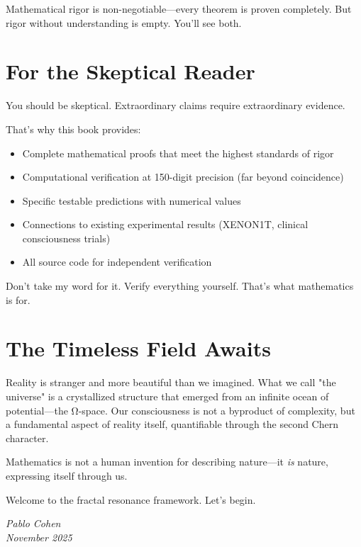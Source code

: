 Mathematical rigor is non-negotiable—every theorem is proven completely. But rigor without understanding is empty. You'll see both.

\section*{For the Skeptical Reader}

You should be skeptical. Extraordinary claims require extraordinary evidence.

That's why this book provides:
\begin{itemize}
\item Complete mathematical proofs that meet the highest standards of rigor
\item Computational verification at 150-digit precision (far beyond coincidence)
\item Specific testable predictions with numerical values
\item Connections to existing experimental results (XENON1T, clinical consciousness trials)
\item All source code for independent verification
\end{itemize}

Don't take my word for it. Verify everything yourself. That's what mathematics is for.

\section*{The Timeless Field Awaits}

Reality is stranger and more beautiful than we imagined. What we call "the universe" is a crystallized structure that emerged from an infinite ocean of potential—the Ω-space. Our consciousness is not a byproduct of complexity, but a fundamental aspect of reality itself, quantifiable through the second Chern character.

Mathematics is not a human invention for describing nature—it \textit{is} nature, expressing itself through us.

Welcome to the fractal resonance framework. Let's begin.

\vspace{1cm}

\begin{flushright}
\textit{Pablo Cohen}\\
\textit{November 2025}
\end{flushright}

\endgroup

